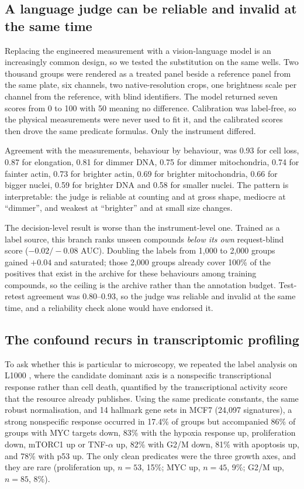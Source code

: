 \documentclass[11pt]{article}
\begin{document}
\subsection{A language judge can be reliable and invalid at the same time}

Replacing the engineered measurement with a vision-language model is an increasingly common
design, so we tested the substitution on the same wells. Two thousand groups were rendered
as a treated panel beside a reference panel from the same plate, six channels, two
native-resolution crops, one brightness scale per channel from the reference, with blind
identifiers. The model returned seven scores from 0 to 100 with 50 meaning no difference.
Calibration was label-free, so the physical measurements were never used to fit it, and the
calibrated scores then drove the same predicate formulas. Only the instrument differed.

Agreement with the measurements, behaviour by behaviour, was 0.93 for cell loss, 0.87 for
elongation, 0.81 for dimmer DNA, 0.75 for dimmer mitochondria, 0.74 for fainter actin,
0.73 for brighter actin, 0.69 for brighter mitochondria, 0.66 for bigger nuclei, 0.59 for
brighter DNA and 0.58 for smaller nuclei. The pattern is interpretable: the judge is
reliable at counting and at gross shape, mediocre at ``dimmer'', and weakest at ``brighter''
and at small size changes.

The decision-level result is worse than the instrument-level one. Trained as a label
source, this branch ranks unseen compounds \emph{below its own} request-blind score
($-0.02/-0.08$ AUC). Doubling the labels from 1,000 to 2,000 groups gained $+0.04$ and
saturated; those 2,000 groups already cover 100\% of the positives that exist in the
archive for these behaviours among training compounds, so the ceiling is the archive rather
than the annotation budget. Test-retest agreement was 0.80--0.93, so the judge was reliable
and invalid at the same time, and a reliability check alone would have endorsed it.

\subsection{The confound recurs in transcriptomic profiling}

To ask whether this is particular to microscopy, we repeated the label analysis on L1000
\citep{subramanian2017lincs}, where the candidate dominant axis is a nonspecific
transcriptional response rather than cell death, quantified by the transcriptional activity
score that the resource already publishes. Using the same predicate constants, the same
robust normalisation, and 14 hallmark gene sets in MCF7 (24,097 signatures), a strong
nonspecific response occurred in 17.4\% of groups but accompanied 86\% of groups with MYC
targets down, 83\% with the hypoxia response up, proliferation down, mTORC1 up or TNF-$\alpha$
up, 82\% with G2/M down, 81\% with apoptosis up, and 78\% with p53 up. The only clean
predicates were the three growth axes, and they are rare (proliferation up, $n = 53$, 15\%;
MYC up, $n = 45$, 9\%; G2/M up, $n = 85$, 8\%).
\end{document}
